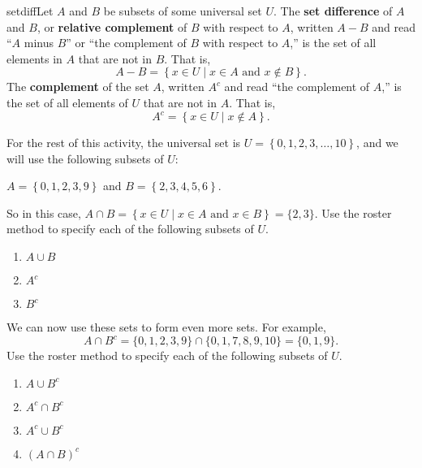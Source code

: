 \begin{previewactivity}
\begin{defbox}{setdiff}{Let  $A$  and  $B$ be subsets of some universal set  $U$\!.  The 
\textbf{set difference}
%
%
 of  $A$  and  $B$, or \textbf{relative complement}
%
%
 of  $B$  with respect to  $A$, written  $A - B$ and read ``$A$ minus $B$'' or ``the complement of  $B$  with respect to  $A$,'' is the set of all elements in  $A$  that are not in  $B$.  That is,
\[
A - B = \left\{ {x \in U} \mid {x \in A} \text{ and } {x \notin B} \right\}\!.
\] \label{sym:setdiff}
The \textbf{complement}
%
%
 of the set  $A$, written  $A^c $ and read ``the complement of $A$,'' is the set of all elements of  $U$  that are not in  $A$.  That is,
\[
A^c  = \left\{ {x \in U} \mid {x \notin A} \right\}\!.
\]} \label{sym:complement}
\end{defbox}

\noindent
For the rest of this \typel activity, the universal set is 
$U = \left\{ {0, 1, 2, 3,  \ldots , 10} \right\}$, and we will use the following subsets of  $U$:
\begin{center}
$A = \left\{ {0, 1, 2, 3, 9} \right\}$ \qquad and \qquad  $B = \left\{ {2, 3, 4, 5, 6} \right\}$.
\end{center}
So in this case, $A \cap B = \left\{ {x \in U} \mid {x \in A \text{  and  } x \in B}  \right\} = \{2, 3 \}$.  Use the roster method to specify each of the following subsets of $U$.
\begin{multicols}{3}
\begin{enumerate}
  \item $A \cup B$
  \item $A^c$
  \item $B^c$
\end{enumerate}
\end{multicols}

\noindent
We can now use these sets to form even more sets.  For example,
\[
A \cap B^c = \{0, 1, 2, 3, 9 \} \cap \{0, 1, 7, 8, 9, 10 \} = \{0, 1, 9 \}.
\]
Use the roster method to specify each of the following subsets of $U$.
\begin{multicols}{4}
\setcounter{oldenumi}{\theenumi}
\begin{enumerate} \setcounter{enumi}{\theoldenumi}
  \item $A \cup B^c$
  \item $A^c \cap B^c$
  \item $A^c \cup B^c$
  \item $(A \cap B)^c$
\end{enumerate}
\end{multicols}


\end{previewactivity}
